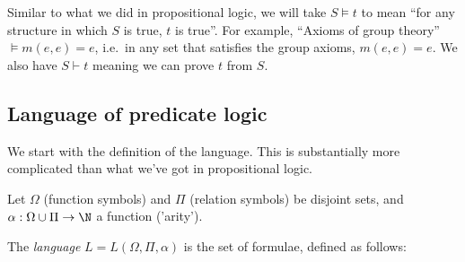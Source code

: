 \documentclass[a4paper]{article}
\begin{document}
Similar to what we did in propositional logic, we will take $S\models t$ to mean ``for any structure in which $S$ is true, $t$ is true''. For example, ``Axioms of group theory'' $\models m(e, e) = e$, i.e.\ in any set that satisfies the group axioms, $m(e, e) = e$. We also have $S\vdash t$ meaning we can prove $t$ from $S$.

\subsection{Language of predicate logic}
We start with the definition of the language. This is substantially more complicated than what we've got in propositional logic.
\begin{defi}[Language]
  Let $\Omega$ (function symbols) and $\Pi$ (relation symbols) be disjoint sets, and $\alpha : \Omega\cup\Pi \to \N$ a function ('arity').

  The \emph{language} $L = L(\Omega, \Pi, \alpha)$ is the set of formulae, defined as follows:


\end{defi}
\end{document}
